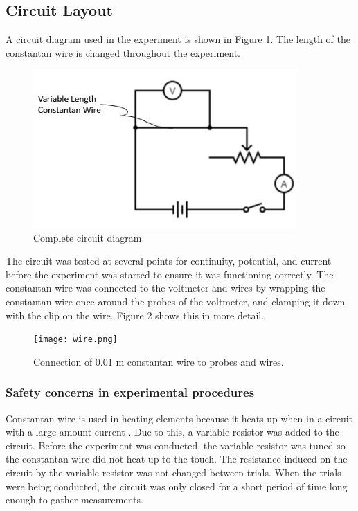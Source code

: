 \documentclass{article}
\begin{document}
\subsection{Circuit Layout}
A circuit diagram used in the experiment is shown in Figure 1. The length of the constantan wire is changed throughout the experiment.

\begin{figure}
\centering
\includegraphics[width=0.9\textwidth]{circuit.png}
\caption{\label{fig:circuit}Complete circuit diagram.}
\end{figure}

The circuit was tested at several points for continuity, potential, and current before the experiment was started to ensure it was functioning correctly. The constantan wire was connected to the voltmeter and wires by wrapping the constantan wire once around the probes of the voltmeter, and clamping it down with the clip on the wire. Figure 2 shows this in more detail.

\begin{figure}
\centering
\texttt{[image: wire.png]}
\caption{\label{fig:wire}Connection of 0.01 m constantan wire to probes and wires.}
\end{figure}

\subsubsection{Safety concerns in experimental procedures}
\label{sec:safe}

Constantan wire is used in heating elements because it heats up when in a circuit with a large amount current \cite{sis}. Due to this, a variable resistor was added to the circuit. Before the experiment was conducted, the variable resistor was tuned so the constantan wire did not heat up to the touch. The resistance induced on the circuit by the variable resistor was not changed between trials. When the trials were being conducted, the circuit was only closed for a short period of time long enough to gather measurements.
\end{document}
